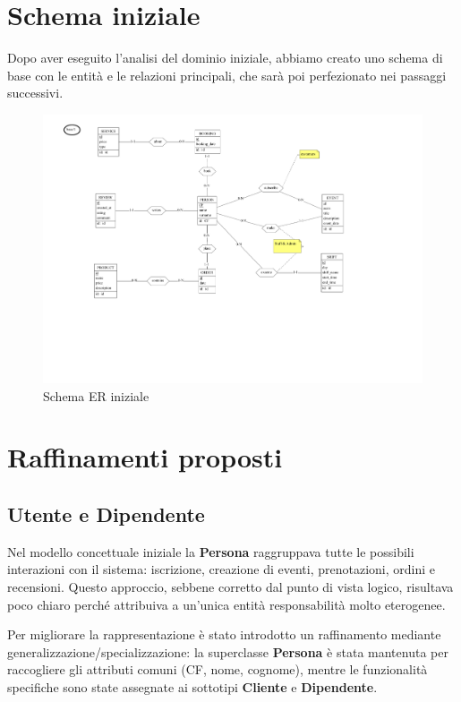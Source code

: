 \documentclass[a4paper,12pt]{report}
\begin{document}
\section{Schema iniziale}
Dopo aver eseguito l'analisi del dominio iniziale, abbiamo creato uno
schema di base con le entità e le relazioni principali, che sarà poi
perfezionato nei passaggi successivi.
\begin{figure}[H]
  \centering
  \includegraphics[width=\textwidth, trim=100pt 170pt 175pt 0pt,
  clip]{./schemas/er-base.pdf}
  \caption{Schema ER iniziale}
  \label{fig:schema-iniziale}
\end{figure}

\section{Raffinamenti proposti}
\subsection{Utente e Dipendente}
Nel modello concettuale iniziale la \textbf{Persona} raggruppava
tutte le possibili interazioni con il sistema: iscrizione, creazione
di eventi, prenotazioni, ordini e recensioni. Questo approccio,
sebbene corretto dal punto di vista logico, risultava poco chiaro
perché attribuiva a un'unica entità responsabilità molto eterogenee.

\vspace{\baselineskip}
Per migliorare la rappresentazione è stato introdotto un raffinamento
mediante generalizzazione/specializzazione: la superclasse
\textbf{Persona} è stata mantenuta per raccogliere gli attributi
comuni (CF, nome, cognome), mentre le funzionalità specifiche sono
state assegnate ai sottotipi \textbf{Cliente} e \textbf{Dipendente}.
\end{document}
